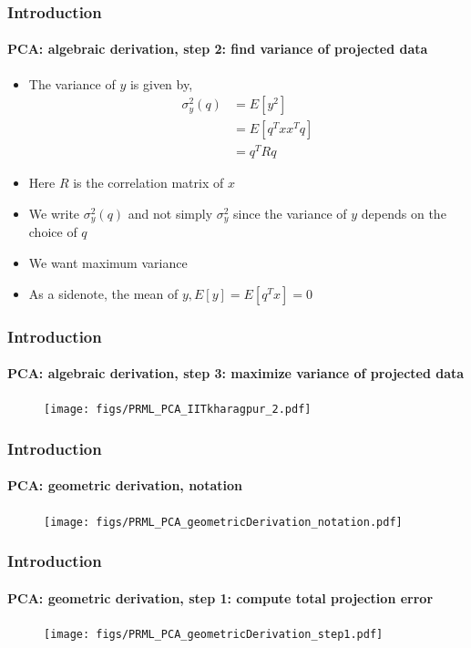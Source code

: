\begin{frame}
\frametitle{Introduction}
\framesubtitle{PCA: algebraic derivation, step 2: find variance of projected data}
\logoCSIPCPL\mypagenum
	\begin{itemize}
 		\item The variance of $y$ is given by,
			\begin{align*}
			 \sigma^2_y(q) &= E[y^2]\\
				&= E[q^Txx^Tq] \\
				&= q^TRq	
			\end{align*}
 		\item Here $R$ is the correlation matrix of $x$
		\item We write $\sigma^2_y(q)$ and not simply $\sigma^2_y$ since the variance of $y$ depends on the choice of $q$  	
		\item We want maximum variance
		\item As a sidenote, the mean of $y, E[y] = E[q^Tx]=0$
	\end{itemize}
\end{frame}			



\begin{frame}
\frametitle{Introduction}
\framesubtitle{PCA: algebraic derivation, step 3: maximize variance of projected data}
\logoCSIPCPL\mypagenum
	\begin{figure}
		\texttt{[image: figs/PRML\_PCA\_IITkharagpur\_2.pdf]}
	\end{figure}
\end{frame}


\begin{frame}[plain]
\frametitle{Introduction}
\framesubtitle{PCA: geometric derivation, notation}
\logoCSIPCPL\mypagenum
	\begin{changemargin}{-1.3in}{0in} 
		\begin{figure}
			\texttt{[image: figs/PRML\_PCA\_geometricDerivation\_notation.pdf]}
		\end{figure}
	\end{changemargin}
\end{frame}


\begin{frame}
\frametitle{Introduction}
\framesubtitle{PCA: geometric derivation, step 1: compute total projection error}
\logoCSIPCPL\mypagenum	
	\begin{figure}
		\texttt{[image: figs/PRML\_PCA\_geometricDerivation\_step1.pdf]}
	\end{figure}
\end{frame}



